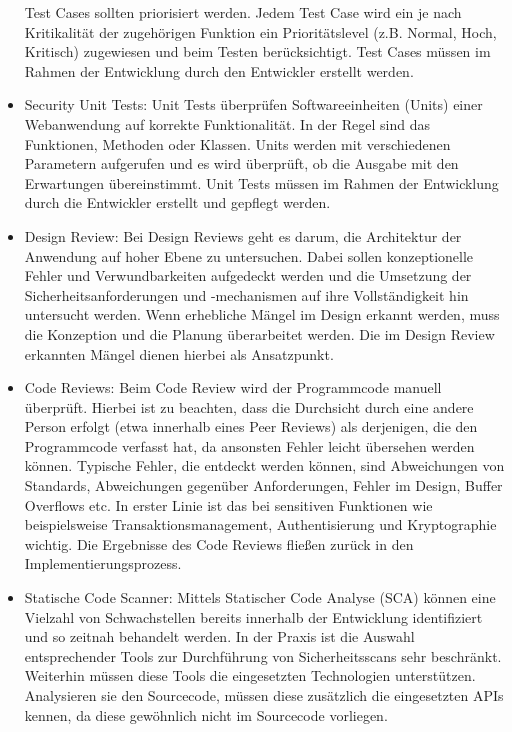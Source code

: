 \documentclass[12pt,oneside,a4paper,parskip,pointlessnumbers]{scrbook}
\begin{document}
\begin{itemize}
    Test Cases sollten priorisiert werden. Jedem Test Case wird ein je nach Kritikalität der zugehörigen
    Funktion ein Prioritätslevel (z.B. Normal, Hoch, Kritisch) zugewiesen und beim Testen
    berücksichtigt.
    Test Cases müssen im Rahmen der Entwicklung durch den Entwickler erstellt werden.
    \item Security Unit Tests:
    Unit Tests überprüfen Softwareeinheiten (Units) einer Webanwendung auf korrekte Funktionalität.
    In der Regel sind das Funktionen, Methoden oder Klassen. Units werden mit verschiedenen
    Parametern aufgerufen und es wird überprüft, ob die Ausgabe mit den Erwartungen
    übereinstimmt.
    Unit Tests müssen im Rahmen der Entwicklung durch die Entwickler erstellt und gepflegt werden.
    \item Design Review:
    Bei Design Reviews geht es darum, die Architektur der Anwendung auf hoher Ebene zu
    untersuchen. Dabei sollen konzeptionelle Fehler und Verwundbarkeiten aufgedeckt werden und
    die Umsetzung der Sicherheitsanforderungen und -mechanismen auf ihre Vollständigkeit hin
    untersucht werden. Wenn erhebliche Mängel im Design erkannt werden, muss die Konzeption und die Planung überarbeitet werden. Die im Design Review erkannten Mängel dienen hierbei als Ansatzpunkt.
    \item Code Reviews:
    Beim Code Review wird der Programmcode manuell überprüft. Hierbei ist zu beachten, dass die
    Durchsicht durch eine andere Person erfolgt (etwa innerhalb eines Peer Reviews) als derjenigen, die
    den Programmcode verfasst hat, da ansonsten Fehler leicht übersehen werden können. Typische
    Fehler, die entdeckt werden können, sind Abweichungen von Standards, Abweichungen gegenüber
    Anforderungen, Fehler im Design, Buffer Overflows etc. In erster Linie ist das bei sensitiven
    Funktionen wie beispielsweise Transaktionsmanagement, Authentisierung und Kryptographie
    wichtig. Die Ergebnisse des Code Reviews fließen zurück in den Implementierungsprozess.
    \item Statische Code Scanner:
    Mittels Statischer Code Analyse (SCA) können eine Vielzahl von Schwachstellen bereits innerhalb
    der Entwicklung identifiziert und so zeitnah behandelt werden. In der Praxis ist die Auswahl
    entsprechender Tools zur Durchführung von Sicherheitsscans sehr beschränkt. Weiterhin müssen
    diese Tools die eingesetzten Technologien unterstützen. Analysieren sie den Sourcecode, müssen
    diese zusätzlich die eingesetzten APIs kennen, da diese gewöhnlich nicht im Sourcecode vorliegen.

\end{itemize}
\end{document}
